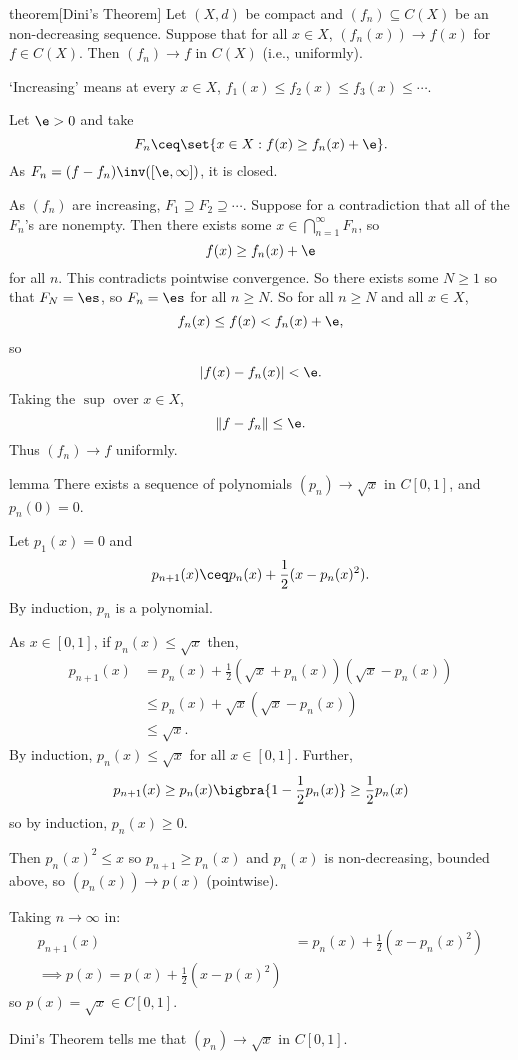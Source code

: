\documentclass[class=article, crop=false]{standalone}
\begin{document}
\begin{result}{theorem}[Dini's Theorem]
  Let $(X,d)$ be compact and $(f_n) \subseteq C(X)$ be an non-decreasing sequence. Suppose that for all $x \in X$, $(f_n(x)) \to f(x)$ for $f \in C(X)$. Then $(f_n) \to f$ in $C(X)$ (i.e., uniformly).
\end{result}
\begin{rem}
  `Increasing' means at every $x \in X$, $f_1(x) \leq f_2(x) \leq f_3(x) \leq \cdots$.
\end{rem}
\begin{pf}
  Let $\e > 0$ and take
    \[
      F_n \ceq \set{x \in X : f(x) \geq f_n(x) + \e}.
    \]
  As $F_n = (f-f_n)\inv([\e,\infty])$, it is closed.

  As $(f_n)$ are increasing, $F_1 \supseteq F_2 \supseteq \cdots$. Suppose for a contradiction that all of the $F_n$'s are nonempty. Then there exists some $x \in \bigcap_{n=1}^{\infty} F_n$, so
    \[
      f(x) \geq f_n(x) + \e
    \]
  for all $n$. This contradicts pointwise convergence. So there exists some $N \geq 1$ so that $F_N = \es$, so $F_n = \es$ for all $n \geq N$. So for all $n \geq N$ and all $x \in X$,
    \[
      f_n(x) \leq f(x) < f_n(x) + \e,
    \]
  so
    \[
      |f(x)-f_n(x)| < \e.
    \]
  Taking the $\sup$ over $x \in X$,
    \[
      \|f-f_n\| \leq \e.
    \]
  Thus $(f_n) \to f$ uniformly.
\end{pf}

\begin{result}{lemma}
  There exists a sequence of polynomials $(p_n) \to \sqrt x$ in $C[0,1]$, and $p_n(0) = 0$.
\end{result}
\begin{pf}
  Let $p_1(x) = 0$ and
    \[
      p_{n+1}(x) \ceq p_n(x) + \frac{1}{2}(x-p_n(x)^2).
    \]
  By induction, $p_n$ is a polynomial.

  As $x \in [0,1]$, if $p_n(x) \leq \sqrt x$ then,
    \begin{align*}
      p_{n+1}(x) &= p_n(x) + \frac{1}{2} (\sqrt x + p_n(x))(\sqrt x - p_n(x)) \\
        &\leq p_n(x) + \sqrt x (\sqrt x - p_n(x)) \\
        &\leq \sqrt x.
    \end{align*}
  By induction, $p_n(x) \leq \sqrt x$ for all $x \in [0,1]$. Further,
    \[
      p_{n+1}(x) \geq p_n(x)\bigbra{1-\frac{1}{2}p_n(x)} \geq \frac{1}{2} p_n(x)
    \]
  so by induction, $p_n(x) \geq 0$.

  Then $p_n(x)^2 \leq x$ so $p_{n+1} \geq p_n(x)$ and $p_n(x)$ is non-decreasing, bounded above, so $(p_n(x)) \to p(x)$ (pointwise).

  Taking $n \to \infty$ in:
    \begin{align*}
      p_{n+1}(x) &= p_n(x) + \frac{1}{2} (x-p_n(x)^2) \\
      \implies p(x) = p(x) + \frac{1}{2} (x-p(x)^2)
    \end{align*}
  so $p(x) = \sqrt x \in C[0,1]$.

  Dini's Theorem tells me that $(p_n) \to \sqrt x$ in $C[0,1]$.
\end{pf}
\end{document}
